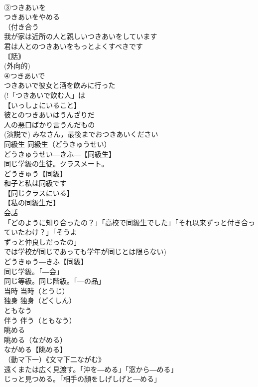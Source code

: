 \documentclass[8pt]{extreport}
\begin{document}
\begin{CJK}{UTF8}{min}
\\	③つきあいを
\\	つきあいをやめる
\\	（付き合う
\\	我が家は近所の人と親しいつきあいをしています
\\	君は人とのつきあいをもっとよくすべきです
\\	｟話｠ 
\\	(外向的) 
\\	④つきあいで
\\	つきあいで彼女と酒を飲みに行った
\\	(!「つきあいで飲む人」は 
\\	【いっしょにいること】
\\	彼とのつきあいはうんざりだ
\\	人の悪口ばかり言うんだもの
\\	(演説で) みなさん，最後までおつきあいください
\\	同級生		同級生（どうきゅうせい）
\\	どうきゅうせい―きふ―【同級生】
\\	同じ学級の生徒。クラスメート。
\\	どうきゅう【同級】
\\	和子と私は同級です
\\	【同じクラスにいる】
\\	【私の同級生だ】
\\	会話
\\	「どのように知り合ったの？」「高校で同級生でした」「それ以来ずっと付き合っていたわけ？」「そうよ
\\	ずっと仲良しだったの」
\\	では学校が同じであっても学年が同じとは限らない) 
\\	どうきゅう―きふ【同級】
\\	同じ学級。「―会」
\\	同じ等級。同じ階級。「―の品」
\\	当時		当時（とうじ）
\\	独身		独身（どくしん）
\\	ともなう
\\	伴う		伴う（ともなう）
\\	眺める
\\	眺める（ながめる）
\\	ながめる【眺める】
\\	（動マ下一）《文マ下二ながむ》
\\	遠くまたは広く見渡す。「沖を―める」「窓から―める」
\\	じっと見つめる。「相手の顔をしげしげと―める」

\end{CJK}
\end{document}
